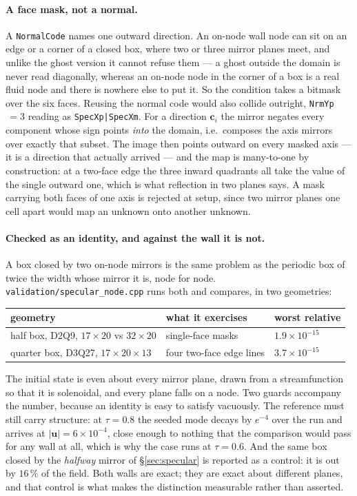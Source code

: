 \documentclass[11pt,a4paper]{article}
\newcommand{\code}[1]{\texttt{\small #1}}
\newcommand{\uu}{\bm{u}}
\begin{document}
\paragraph{A face mask, not a normal.} A \code{NormalCode} names one outward
direction. An on-node wall node can sit on an edge or a corner of a closed box,
where two or three mirror planes meet, and unlike the ghost version it cannot
refuse them --- a ghost outside the domain is never read diagonally, whereas an
on-node node in the corner of a box is a real fluid node and there is nowhere
else to put it. So the condition takes a bitmask over the six faces. Reusing the
normal code would also collide outright, \code{NrmYp}$\,=3$ reading as
\code{SpecXp|SpecXm}. For a direction $\bm{c}_i$ the mirror negates every
component whose sign points \emph{into} the domain, i.e.\ composes the axis
mirrors over exactly that subset. The image then points outward on every masked
axis --- it is a direction that actually arrived --- and the map is many-to-one
by construction: at a two-face edge the three inward quadrants all take the value
of the single outward one, which is what reflection in two planes says. A mask
carrying both faces of one axis is rejected at setup, since two mirror planes one
cell apart would map an unknown onto another unknown.

\paragraph{Checked as an identity, and against the wall it is not.} A box closed
by two on-node mirrors is the same problem as the periodic box of twice the width
whose mirror it is, node for node. \code{validation/specular\_node.cpp} runs both
and compares, in two geometries:

\begin{center}
\begin{tabular}{lll}
\hline
geometry & what it exercises & worst relative \\
\hline
half box, D2Q9, $17\times20$ vs $32\times20$ & single-face masks & $1.9\times10^{-15}$ \\
quarter box, D3Q27, $17\times20\times13$ & four two-face edge lines & $3.7\times10^{-15}$ \\
\hline
\end{tabular}
\end{center}

\noindent The initial state is even about every mirror plane, drawn from a
streamfunction so that it is solenoidal, and every plane falls on a node. Two
guards accompany the number, because an identity is easy to satisfy vacuously.
The reference must still carry structure: at $\tau=0.8$ the seeded mode decays by
$e^{-4}$ over the run and arrives at $|\uu|=6\times10^{-4}$, close enough to
nothing that the comparison would pass for any wall at all, which is why the case
runs at $\tau=0.6$. And the same box closed by the \emph{halfway} mirror of
\S\ref{sec:specular} is reported as a control: it is out by $16\,\%$ of the
field. Both walls are exact; they are exact about different planes, and that
control is what makes the distinction measurable rather than asserted.
\end{document}
